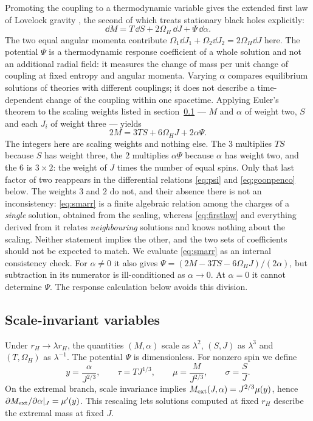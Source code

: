 \documentclass[11pt,a4paper]{article}
\begin{document}
Promoting the coupling to a thermodynamic variable gives the extended first
law of Lovelock gravity \cite{Kastor:2010gq,Neri:2024}, the second of which
treats stationary black holes explicitly:
\begin{equation}
  \dd M=T\,\dd S+2\Omega_H\,\dd J+\Psi\,\dd\alpha .
  \label{eq:firstlaw}
\end{equation}
The two equal angular momenta contribute
$\Omega_1\dd J_1+\Omega_2\dd J_2=2\Omega_H\dd J$ here. The potential $\Psi$ is
a thermodynamic response coefficient of a whole solution and not an additional
radial field: it measures the change of mass per unit change of coupling at
fixed entropy and angular momenta. Varying $\alpha$ compares equilibrium
solutions of theories with different couplings; it does not describe a
time-dependent change of the coupling within one spacetime.
Applying Euler's theorem to the scaling weights listed in
section~\ref{sec:invariants} --- $M$ and $\alpha$ of weight two, $S$ and each
$J_i$ of weight three --- yields
\begin{equation}
 2M=3TS+6\Omega_HJ+2\alpha\Psi.
 \label{eq:smarr}
\end{equation}
The integers here are scaling weights and nothing else. The $3$ multiplies
$TS$ because $S$ has weight three, the $2$ multiplies $\alpha\Psi$ because
$\alpha$ has weight two, and the $6$ is $3\times2$: the weight of $J$ times
the number of equal spins. Only that last factor of two reappears in the
differential relations \eqref{eq:psi} and \eqref{eq:goonpenco} below.
The weights $3$ and $2$ do not, and their absence there is not an
inconsistency: \eqref{eq:smarr} is a finite algebraic relation among the
charges of a \emph{single} solution, obtained from the scaling, whereas
\eqref{eq:firstlaw} and everything derived from it relates \emph{neighbouring}
solutions and knows nothing about the scaling. Neither statement implies the
other, and the two sets of coefficients should not be expected to match.
We evaluate \eqref{eq:smarr} as an internal consistency check.
For $\alpha\ne0$ it also gives
$\Psi=(2M-3TS-6\Omega_HJ)/(2\alpha)$, but subtraction in its numerator
is ill-conditioned as $\alpha\to0$. At $\alpha=0$ it cannot determine
$\Psi$. The response calculation below avoids this division.

\subsection{Scale-invariant variables}
\label{sec:invariants}

Under $r_H\to\lambda r_H$, the quantities $(M,\alpha)$ scale as $\lambda^2$,
$(S,J)$ as $\lambda^3$ and $(T,\Omega_H)$ as $\lambda^{-1}$.
The potential $\Psi$ is dimensionless.
For nonzero spin we define
\begin{equation}
 y=\frac\alpha{J^{2/3}},\qquad \tau=TJ^{1/3},\qquad
 \mu=\frac M{J^{2/3}},\qquad \sigma=\frac SJ.
 \label{eq:spinvars}
\end{equation}
On the extremal branch, scale invariance implies
$M_{\mathrm{ext}}(J,\alpha)=J^{2/3}\mu(y)$, hence
$\partial M_{\mathrm{ext}}/\partial\alpha|_J=\mu'(y)$.
This rescaling lets solutions computed at fixed $r_H$ describe the
extremal mass at fixed $J$.
\end{document}
